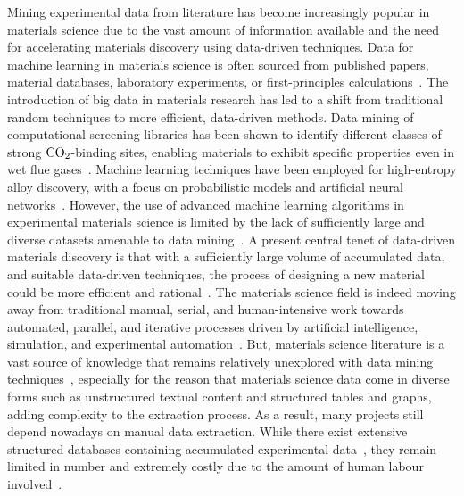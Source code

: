 Mining experimental data from literature has become increasingly popular in materials science due to the vast amount of information available and the need for accelerating materials discovery using data-driven techniques. Data for machine learning in materials science is often sourced from published papers, material databases, laboratory experiments, or first-principles calculations~\cite{xuSmallDataMachine2023}. The introduction of big data in materials research has led to a shift from traditional random techniques to more efficient, data-driven methods. Data mining of computational screening libraries has been shown to identify different classes of strong $\rm CO_{2}$-binding sites, enabling materials to exhibit specific properties even in wet flue gases~\cite{boyddatadriven2019}. Machine learning techniques have been employed for high-entropy alloy discovery, with a focus on probabilistic models and artificial neural networks~\cite{raomachlearn2022}. However, the use of advanced machine learning algorithms in experimental materials science is limited by the lack of sufficiently large and diverse datasets amenable to data mining~\cite{zakutayevanopenexp2018}. A present central tenet of data-driven materials discovery is that with a sufficiently large volume of accumulated data, and suitable data-driven techniques, the process of designing a new material could be more efficient and rational~\cite{huanapolydat2016}. The materials science field is indeed moving away from traditional manual, serial, and human-intensive work towards automated, parallel, and iterative processes driven by artificial intelligence, simulation, and experimental automation~\cite{pyzerknappaccmat2022, huber2020machine}. But, materials science literature is a vast source of knowledge that remains relatively unexplored with data mining techniques~\cite{park2021advances}, especially for the reason that materials science data come in diverse forms such as unstructured textual content and structured tables and graphs, adding complexity to the extraction process. As a result, many projects still depend nowadays on manual data extraction. While there exist extensive structured databases containing accumulated experimental data~\cite{chittambigdat2021}, they remain limited in number and extremely costly due to the amount of human labour involved~\cite{madataug2020}.

